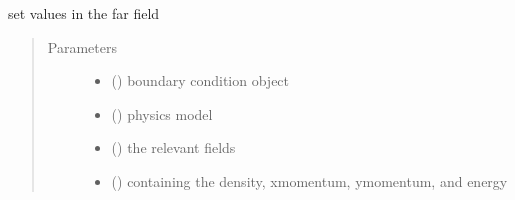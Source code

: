 \documentclass[letterpaper,10pt,english]{sphinxmanual}
\begin{document}
\begin{fulllineitems}
\label{\detokenize{autoapi/bcfar/index:bcfar.far_field}}
\sphinxAtStartPar
set values in the far field
\begin{quote}\begin{description}
\item[{Parameters}] \leavevmode\begin{itemize}
\item {} 
\sphinxAtStartPar
{} () \textendash{} boundary condition object

\item {} 
\sphinxAtStartPar
{} ({\hyperref[\detokenize{autoapi/NavierStokes/index:NavierStokes.NavierStokes}]{}}) \textendash{} physics model

\item {} 
\sphinxAtStartPar
{} ({\hyperref[\detokenize{autoapi/Workspace/index:Workspace.Workspace}]{}}) \textendash{} the relevant fields

\item {} 
\sphinxAtStartPar
{} ({\hyperref[\detokenize{autoapi/Field/index:Field.Field}]{}}) \textendash{} containing the density, x\sphinxhyphen{}momentum, y\sphinxhyphen{}momentum, and energy

\end{itemize}

\end{description}\end{quote}

\end{fulllineitems}



\section{}
\label{\detokenize{autoapi/bcwall/index:module-bcwall}}\label{\detokenize{autoapi/bcwall/index:bcwall}}\label{\detokenize{autoapi/bcwall/index::doc}}
\end{document}

